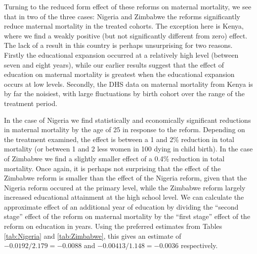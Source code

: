 \documentclass{article}[12pt,subeqn]
\begin{document}
\begin{spacing}{1.4}
Turning to the reduced form effect of these reforms on maternal mortality, we see that in two of the three cases: Nigeria
and Zimbabwe the reforms significantly reduce maternal mortality in the treated cohorts.  The exception here is Kenya,
where we find a weakly positive (but not significantly different from zero) effect.  The lack of a result in this country
is perhaps unsurprising for two reasons.  Firstly the educational expansion occurred at a relatively high level (between seven
and eight years), while our earlier results suggest that the effect of education on maternal mortality is greatest when
the educational expansion occurs at low levels.  Secondly, the DHS data on maternal mortality from Kenya is by far the noisiest,
with large fluctuations by birth cohort over the range of the treatment period.

In the case of Nigeria we find statistically and economically significant reductions in maternal mortality by the age of 
25 in response to the reform.  Depending on the treatment examined, the effect is between a 1 and 2\% reduction in total
mortality (or between 1 and 2 less women in 100 dying in child birth).  In the case of Zimbabwe we find a slightly smaller
effect of a 0.4\% reduction in total mortality.  Once again, it is perhaps not surprising that the effect of the Zimbabwe 
reform is smaller than the effect of the Nigeria reform, given that the Nigeria reform occured at the primary level, while 
the Zimbabwe reform largely increased educational attainment at the high school level.  We can calculate the approximate 
effect of an additional year of education by dividing the ``second stage'' effect of the reform on maternal mortality by 
the ``first stage'' effect of the reform on education in years.  Using the preferred estimates from Tables \ref{tab:Nigeria} 
and \ref{tab:Zimbabwe}, this gives an estimate of $-0.0192/2.179=-0.0088$ and $-0.00413/1.148=-0.0036$ respectively.


\end{spacing}
\end{document}
